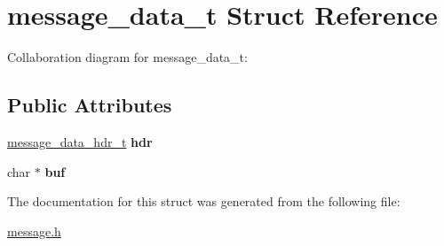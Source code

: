 \hypertarget{structmessage__data__t}{}\section{message\+\_\+data\+\_\+t Struct Reference}
\label{structmessage__data__t}


Collaboration diagram for message\+\_\+data\+\_\+t\+:
\subsection*{Public Attributes}
\begin{DoxyCompactItemize}
\item 
\hyperlink{structmessage__data__hdr__t}{message\+\_\+data\+\_\+hdr\+\_\+t} {\bfseries hdr}\hypertarget{structmessage__data__t_a45328b402174241b93bcefcdceca4545}{}\label{structmessage__data__t_a45328b402174241b93bcefcdceca4545}

\item 
char $\ast$ {\bfseries buf}\hypertarget{structmessage__data__t_aba52694fd59a6cf8227b84b3cd1c30dd}{}\label{structmessage__data__t_aba52694fd59a6cf8227b84b3cd1c30dd}

\end{DoxyCompactItemize}


The documentation for this struct was generated from the following file\+:\begin{DoxyCompactItemize}
\item 
\hyperlink{message_8h}{message.\+h}\end{DoxyCompactItemize}
